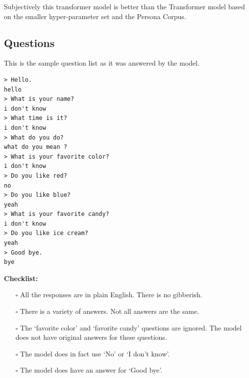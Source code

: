 Subjectively this transformer model is better than the Transformer model based on the smaller hyper-parameter set and the Persona Corpus.


\subsection*{Questions}
This is the sample question list as it was answered by the model.

\begin{verbatim}
> Hello.
hello 
> What is your name?
i don't know 
> What time is it?
i don't know 
> What do you do?
what do you mean ?
> What is your favorite color?
i don't know 
> Do you like red?
no 
> Do you like blue?
yeah 
> What is your favorite candy?
i don't know 
> Do you like ice cream?
yeah 
> Good bye.
bye 
\end{verbatim}

\noindent \textbf{Checklist:} 

\begin{itemize}
	
	\item[\rlap{\raisebox{0.3ex}{\hspace{0.4ex}\scriptsize \ding{52}}}$\square$] All the responses are in plain English. There is no gibberish.
	
	\item[\rlap{\raisebox{0.3ex}{\hspace{0.4ex}\scriptsize \ding{52}}}$\square$] There is a variety of answers. Not all answers are the same.
	
	\item[\rlap{\raisebox{0.3ex}{\hspace{0.4ex}\scriptsize \ding{56}}}$\square$] The `favorite color' and `favorite candy' questions are ignored. The model does not have original answers for these questions.
	
	\item[\rlap{\raisebox{0.3ex}{\hspace{0.4ex}\scriptsize \ding{56}}}$\square$] The model does in fact use `No' or `I don't know'. %
	
	\item[\rlap{\raisebox{0.3ex}{\hspace{0.4ex}\scriptsize \ding{52}}}$\square$] The model does have an answer for `Good bye'.
\end{itemize}

